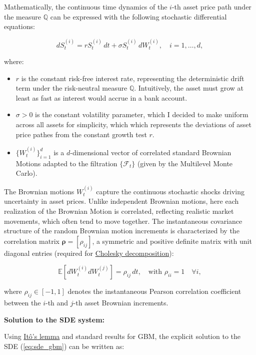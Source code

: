 \documentclass[titlepage]{article}
\begin{document}
Mathematically, the continuous time dynamics of the \(i\)-th asset price path under the measure \(\mathbb{Q}\) can be expressed with the following stochastic differential equations:

\[dS_t^{(i)} = r S_t^{(i)}\, dt + \sigma S_t^{(i)}\, dW_t^{(i)}, \quad i=1, \ldots, d,
\label{eq:sde_gbm}\]

where:
\begin{itemize}
    \item \( r \) is the constant risk-free interest rate, representing the deterministic drift term under the risk-neutral measure $\mathbb{Q}$. Intuitively, the asset must grow at least as fast as interest would accrue in a bank account.
    \item \( \sigma > 0 \) is the constant volatility parameter, which I decided to make uniform across all assets for simplicity, which which represents the deviations of asset price pathes from the constant growth test $r$.
    \item \( \{W_t^{(i)}\}_{i=1}^d \) is a \( d \)-dimensional vector of correlated standard Brownian Motions adapted to the filtration \(\{\mathcal{F}_t\}\) (given by the Multilevel Monte Carlo).
\end{itemize}

The Brownian motions \( W_t^{(i)} \) capture the continuous stochastic shocks driving uncertainty in asset prices. Unlike independent Brownian motions, here each realization of the Brownian Motion is correlated, reflecting realistic market movements, which often tend to move together. The instantaneous covariance structure of the random Brownian motion increments is characterized by the correlation matrix \(\boldsymbol{\rho} = [\rho_{ij}]\), a symmetric and positive definite matrix with unit diagonal entries (required for \hyperref[sec:Cholesky]{Cholesky decomposition}):

\begin{equation}
\mathbb{E}[dW_t^{(i)} dW_t^{(j)}] = \rho_{ij} \, dt, \quad \text{with } \rho_{ii} = 1 \quad \forall i,
\label{eq:correlation}
\end{equation}

where \(\rho_{ij} \in [-1,1]\) denotes the instantaneous Pearson correlation coefficient between the \(i\)-th and \(j\)-th asset Brownian increments.

\textbf{Solution to the SDE system:}

Using \hyperref[sec:ito]{Itô’s lemma} and standard results for GBM, the explicit solution to the SDE (\ref{eq:sde_gbm}) can be written as:
\end{document}
